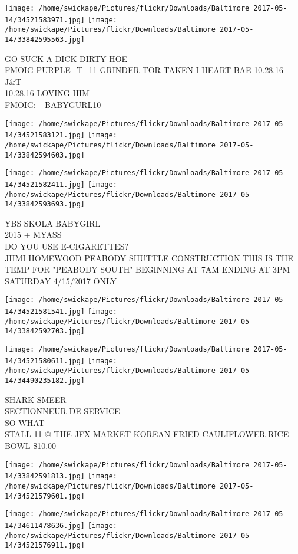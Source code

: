 \documentclass[10pt,letterpaper]{article}
\begin{document}
\texttt{[image: /home/swickape/Pictures/flickr/Downloads/Baltimore 2017-05-14/34521583971.jpg]}
\texttt{[image: /home/swickape/Pictures/flickr/Downloads/Baltimore 2017-05-14/33842595563.jpg]}

GO SUCK A DICK DIRTY HOE\\
FMOIG PURPLE\_T\_11 GRINDER TOR TAKEN I HEART BAE  10.28.16 J\&T\\
10.28.16 LOVING HIM\\
FMOIG: \_BABYGURL10\_
\pagebreak

\texttt{[image: /home/swickape/Pictures/flickr/Downloads/Baltimore 2017-05-14/34521583121.jpg]}
\texttt{[image: /home/swickape/Pictures/flickr/Downloads/Baltimore 2017-05-14/33842594603.jpg]}

\texttt{[image: /home/swickape/Pictures/flickr/Downloads/Baltimore 2017-05-14/34521582411.jpg]}
\texttt{[image: /home/swickape/Pictures/flickr/Downloads/Baltimore 2017-05-14/33842593693.jpg]}

YBS SKOLA BABYGIRL\\
2015 + MYASS\\
DO YOU USE E{-}CIGARETTES?\\
JHMI HOMEWOOD PEABODY SHUTTLE CONSTRUCTION THIS IS THE TEMP FOR "PEABODY SOUTH" BEGINNING AT 7AM ENDING AT 3PM SATURDAY 4/15/2017 ONLY
\pagebreak

\texttt{[image: /home/swickape/Pictures/flickr/Downloads/Baltimore 2017-05-14/34521581541.jpg]}
\texttt{[image: /home/swickape/Pictures/flickr/Downloads/Baltimore 2017-05-14/33842592703.jpg]}

\texttt{[image: /home/swickape/Pictures/flickr/Downloads/Baltimore 2017-05-14/34521580611.jpg]}
\texttt{[image: /home/swickape/Pictures/flickr/Downloads/Baltimore 2017-05-14/34490235182.jpg]}

SHARK SMEER\\
SECTIONNEUR DE SERVICE\\
SO WHAT\\
STALL 11 @ THE JFX MARKET KOREAN FRIED CAULIFLOWER RICE BOWL \$10.00
\pagebreak

\texttt{[image: /home/swickape/Pictures/flickr/Downloads/Baltimore 2017-05-14/33842591813.jpg]}
\texttt{[image: /home/swickape/Pictures/flickr/Downloads/Baltimore 2017-05-14/34521579601.jpg]}

\texttt{[image: /home/swickape/Pictures/flickr/Downloads/Baltimore 2017-05-14/34611478636.jpg]}
\texttt{[image: /home/swickape/Pictures/flickr/Downloads/Baltimore 2017-05-14/34521576911.jpg]}
\end{document}
